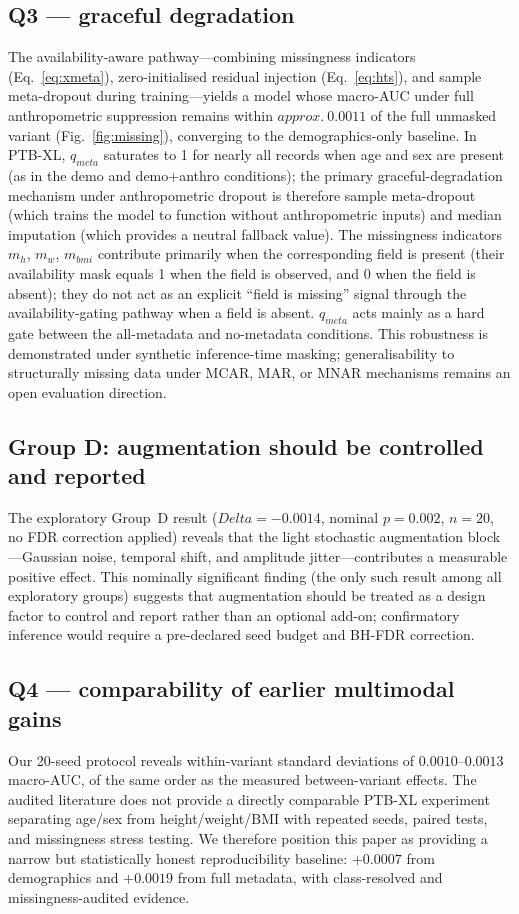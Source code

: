 \documentclass[mathematics,article,pdftex]{Definitions/mdpi}
\def\texttt#1{#1}%
\def\mathrm#1{#1}%
\def\textbf#1{#1}%
\def\Delta{Delta }%
\def\approx{approx.\ }%
\begin{document}
\subsection{Q3 --- graceful degradation}
The availability-aware pathway---combining missingness indicators (Eq.~\eqref{eq:xmeta}), zero-initialised residual injection (Eq.~\eqref{eq:hts}), and sample meta-dropout during training---yields a model whose macro-AUC under full anthropometric suppression remains within $\approx 0.0011$ of the full unmasked variant (Fig.~\ref{fig:missing}), converging to the demographics-only baseline. In PTB-XL, $q_{\mathrm{meta}}$ saturates to 1 for nearly all records when age and sex are present (as in the \texttt{demo} and \texttt{demo+anthro} conditions); the primary graceful-degradation mechanism under anthropometric dropout is therefore \textbf{sample meta-dropout} (which trains the model to function without anthropometric inputs) and \textbf{median imputation} (which provides a neutral fallback value). The missingness indicators $m_h$, $m_w$, $m_{\mathrm{bmi}}$ contribute primarily when the corresponding field is present (their availability mask equals 1 when the field is observed, and 0 when the field is absent); they do not act as an explicit ``field is missing'' signal through the availability-gating pathway when a field is absent. $q_{\mathrm{meta}}$ acts mainly as a hard gate between the all-metadata and no-metadata conditions. This robustness is demonstrated under synthetic inference-time masking; generalisability to structurally missing data under MCAR, MAR, or MNAR mechanisms remains an open evaluation direction.

\subsection{Group D: augmentation should be controlled and reported}
The exploratory Group~D result ($\Delta{=}{-}0.0014$, nominal $p{=}0.002$, $n{=}20$, no FDR correction applied) reveals that the light stochastic augmentation block---Gaussian noise, temporal shift, and amplitude jitter---contributes a measurable positive effect. This nominally significant finding (the only such result among all exploratory groups) suggests that augmentation should be treated as a design factor to control and report rather than an optional add-on; confirmatory inference would require a pre-declared seed budget and BH-FDR correction.

\subsection{Q4 --- comparability of earlier multimodal gains}
Our 20-seed protocol reveals within-variant standard deviations of $0.0010$--$0.0013$ macro-AUC, of the same order as the measured between-variant effects. The audited literature does not provide a directly comparable PTB-XL experiment separating age/sex from height/weight/BMI with repeated seeds, paired tests, and missingness stress testing. We therefore position this paper as providing a narrow but statistically honest reproducibility baseline: $+0.0007$ from demographics and $+0.0019$ from full metadata, with class-resolved and missingness-audited evidence.
\end{document}
